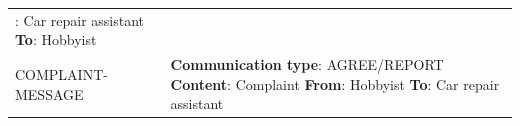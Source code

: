 \begin{tabular}{|>{\colleft}p{3cm}|>{\colleft}p{8.5cm}|}
					  {\bf From}: Car repair assistant\newline
					  {\bf To}: Hobbyist\\
COMPLAINT-MESSAGE			& {\bf Communication type}: AGREE/REPORT\newline
					  {\bf Content}: Complaint\newline
					  {\bf From}: Hobbyist\newline
					  {\bf To}: Car repair assistant\\\hline
\end{tabular}

